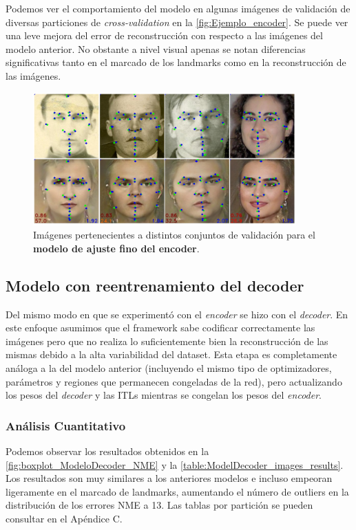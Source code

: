     \noindent Podemos ver el comportamiento del modelo en algunas imágenes de validación de diversas particiones de \textit{cross-validation} en la \autoref{fig:Ejemplo_encoder}. Se puede ver una leve mejora del error de reconstrucción con respecto a las imágenes del modelo anterior. No obstante a nivel visual apenas se notan diferencias significativas tanto en el marcado de los landmarks como en la reconstrucción de las imágenes.

    \begin{figure}[H]
        \centering
        \includegraphics[width=0.9\textwidth]{img/image_encoder.png}
        \caption{Imágenes pertenecientes a distintos conjuntos de validación para el \textbf{modelo de ajuste fino del encoder}.}
        \label{fig:Ejemplo_encoder}
    \end{figure}

    \subsection{Modelo con reentrenamiento del decoder}
        \noindent Del mismo modo en que se experimentó con el \textit{encoder} se hizo con el \textit{decoder}. En este enfoque asumimos que el framework sabe codificar correctamente las imágenes pero que no realiza lo suficientemente bien la reconstrucción de las mismas debido a la alta variabilidad del dataset. Esta etapa es completamente análoga a la del modelo anterior (incluyendo el mismo tipo de optimizadores, parámetros y regiones que permanecen congeladas de la red), pero actualizando los pesos del \textit{decoder} y las ITLs mientras se congelan los pesos del \textit{encoder}.

        \subsubsection*{Análisis Cuantitativo}

        \noindent Podemos observar los resultados obtenidos en la \autoref{fig:boxplot_ModeloDecoder_NME} y la \autoref{table:ModelDecoder_images_results}. Los resultados son muy similares a los anteriores modelos e incluso empeoran ligeramente en el marcado de landmarks, aumentando el número de outliers en la distribución de los errores NME a 13. Las tablas por partición se pueden consultar en el  Apéndice C.


